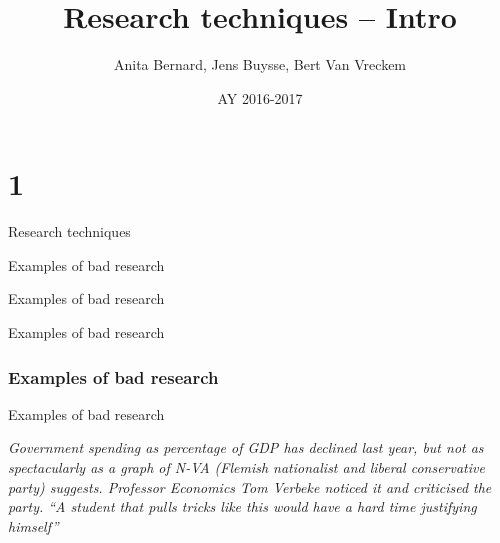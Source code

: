 \documentclass{beamer}
\title[Intro]{Research techniques -- Intro}
\author{Anita Bernard, Jens Buysse, Bert {Van Vreckem}}
\date{AY 2016-2017}
\begin{document}

\HoGentLogo

\titleframe


\section{1}


\begin{frame}{Research techniques}

\end{frame}

\begin{frame}{Examples of bad research}

\end{frame}

\begin{frame}{Examples of bad research}

\end{frame}

\begin{frame}{Examples of bad research}

\end{frame}

\begin{frame}
  \frametitle{Examples of bad research}

\end{frame}

\begin{frame}{Examples of bad research}
	
  
  \tiny \textit{Government spending as percentage of GDP has declined last year, but not as spectacularly as a graph of N-VA (Flemish nationalist and liberal conservative party) suggests. Professor Economics Tom Verbeke noticed it and criticised the party. ``A student that pulls tricks like this would have a hard time justifying himself''}
\end{frame}
\end{document}
